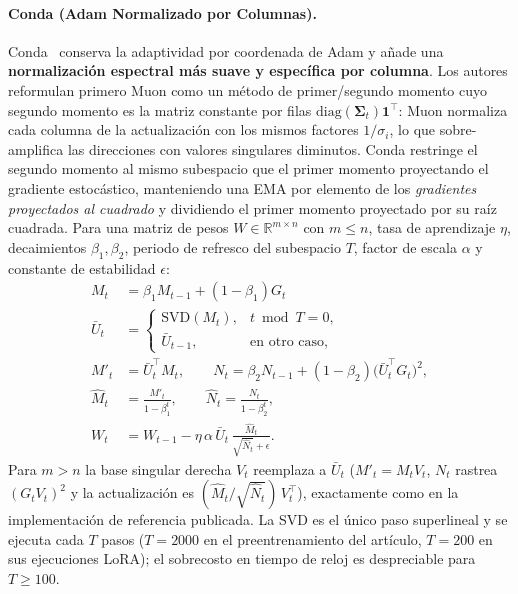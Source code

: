 \paragraph{Conda (Adam Normalizado por Columnas).}
Conda~\citep{wang_conda_2025} conserva la adaptividad por coordenada de Adam y añade una
\textbf{normalización espectral más suave y específica por columna}. Los autores
reformulan primero Muon como un método de primer/segundo momento cuyo segundo momento es
la matriz constante por filas $\mathrm{diag}(\mathbf{\Sigma}_t)\mathbf{1}^\top$: Muon
normaliza cada columna de la actualización con los mismos factores $1/\sigma_i$, lo que
sobre-amplifica las direcciones con valores singulares diminutos. Conda restringe el
segundo momento al mismo subespacio que el primer momento proyectando el gradiente
estocástico, manteniendo una EMA por elemento de los \emph{gradientes proyectados al
cuadrado} y dividiendo el primer momento proyectado por su raíz cuadrada. Para una matriz
de pesos $W \in \mathbb{R}^{m \times n}$ con $m \le n$, tasa de aprendizaje $\eta$,
decaimientos $\beta_1,\beta_2$, periodo de refresco del subespacio $T$, factor de escala
$\alpha$ y constante de estabilidad $\epsilon$:
\begin{align}
M_t &= \beta_1 M_{t-1} + (1-\beta_1) G_t \\
\bar U_t &=
\begin{cases}
\mathrm{SVD}(M_t), & t \bmod T = 0, \\
\bar U_{t-1}, & \text{en otro caso},
\end{cases} \\
M'_t &= \bar U_t^\top M_t, \qquad
N_t = \beta_2 N_{t-1} + (1-\beta_2)\big(\bar U_t^\top G_t\big)^2, \\
\widehat M_t &= \frac{M'_t}{1-\beta_1^t}, \qquad
\widehat N_t = \frac{N_t}{1-\beta_2^t}, \\
W_t &= W_{t-1} - \eta\,\alpha\,\bar U_t\,
      \frac{\widehat M_t}{\sqrt{\widehat N_t} + \epsilon}.
\end{align}
Para $m > n$ la base singular derecha $V_t$ reemplaza a $\bar U_t$ ($M'_t = M_t V_t$,
$N_t$ rastrea $(G_t V_t)^2$ y la actualización es
$(\widehat M_t/\sqrt{\widehat N_t})\,V_t^\top$), exactamente como en la implementación de
referencia publicada. La SVD es el único paso superlineal y se ejecuta cada $T$ pasos
($T=2000$ en el preentrenamiento del artículo, $T=200$ en sus ejecuciones LoRA); el
sobrecosto en tiempo de reloj es despreciable para $T \ge 100$.


